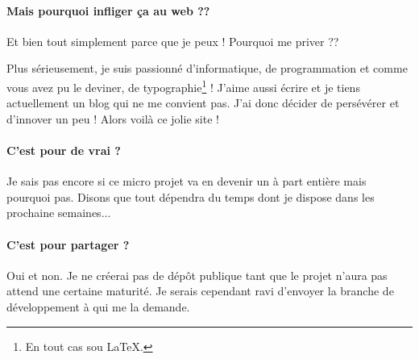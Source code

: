 \paragraph{Mais pourquoi infliger ça au web ??}  
Et bien tout simplement parce que je peux ! Pourquoi me priver ??

Plus sérieusement, je suis passionné d'informatique, de programmation et comme
vous avez pu le deviner, de typographie\footnote{En tout cas sou \LaTeX .} !
J'aime aussi écrire et je tiens actuellement un blog qui ne me convient pas.
J'ai donc décider de persévérer et d'innover un peu ! Alors voilà ce jolie
site !

\paragraph{C'est pour de vrai ?}
Je sais pas encore si ce micro projet va en devenir un à part entière mais
pourquoi pas. Disons que tout dépendra du temps dont je dispose dans les
prochaine semaines...

\paragraph{C'est pour partager ?}
Oui et non. Je ne créerai pas de dépôt publique tant que le projet n'aura pas
attend une certaine maturité. Je serais cependant ravi d'envoyer la branche de
développement à qui me la demande.
